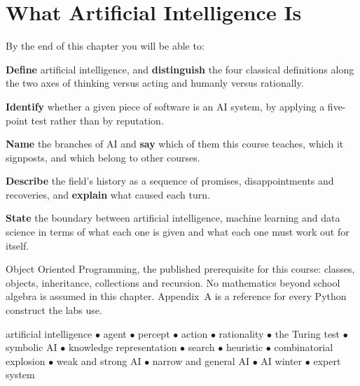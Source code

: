 \chapter{What Artificial Intelligence Is}\label{ch:introduction}

\begin{outcomes}
By the end of this chapter you will be able to:
\begin{tight}
  \item \textbf{Define} artificial intelligence, and \textbf{distinguish} the
        four classical definitions along the two axes of thinking versus acting
        and humanly versus rationally.
  \item \textbf{Identify} whether a given piece of software is an AI system, by
        applying a five-point test rather than by reputation.
  \item \textbf{Name} the branches of AI and \textbf{say} which of them this
        course teaches, which it signposts, and which belong to other courses.
  \item \textbf{Describe} the field's history as a sequence of promises,
        disappointments and recoveries, and \textbf{explain} what caused each
        turn.
  \item \textbf{State} the boundary between artificial intelligence, machine
        learning and data science in terms of what each one is given and what
        each one must work out for itself.
\end{tight}
\end{outcomes}

\begin{prereq}
Object Oriented Programming, the published prerequisite for this course: classes,
objects, inheritance, collections and recursion. No mathematics beyond school
algebra is assumed in this chapter. Appendix~A is a reference for every Python
construct the labs use.
\end{prereq}

\begin{keyterms}
artificial intelligence $\bullet$ agent $\bullet$ percept $\bullet$ action
$\bullet$ rationality $\bullet$ the Turing test $\bullet$ symbolic AI $\bullet$
knowledge representation $\bullet$ search $\bullet$ heuristic $\bullet$
combinatorial explosion $\bullet$ weak and strong AI $\bullet$ narrow and general
AI $\bullet$ AI winter $\bullet$ expert system
\end{keyterms}

